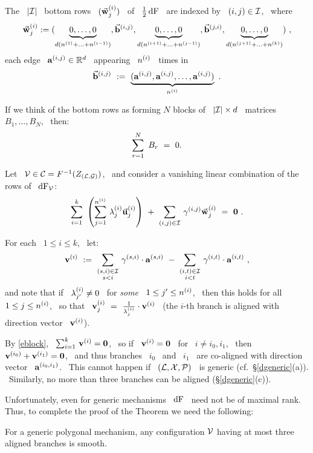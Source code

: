 The \ $|\mathcal{I}|$ \ bottom rows \ $(\vec{\mathbf w}\sp{({i})}\sb{j})$ \ of \ $\frac{1}{2}\operatorname{dF}$ \
are indexed by \ $(i,j)\in\mathcal{I}$, \ where \
$$
\vec{\mathbf w}\sp{({i})}\sb{j}:=
(\underbrace{0,\dotsc,0}_{d(n\sp{({1})}+\dotsc+n\sp{({i-1})})},
\vec{\mathbf{b}}\sp{({i},{j})},\underbrace{0,\dotsc,0}_{d(n\sp{({i+1})}+\dotsc+n\sp{({j-1})})},
\vec{\mathbf{b}}\sp{({j},{i})},\underbrace{0,\dotsc,0}_{d(n\sp{({j+1})}+\dotsc+n\sp{({k})})})~,
$$
%
each edge \ $\mathbf{a}\sp{({i,j})}\in{\mathbb R}^{d}$ \ appearing \ $n\sp{({i})}$ \ times in
$$
\vec{\mathbf{b}}\sp{({i},{j})}~:=~\underbrace{(\mathbf{a}\sp{({i,j})},\mathbf{a}\sp{({i,j})},\dotsc,\mathbf{a}\sp{({i,j})})}_{n\sp{({i})}}~.
$$

If we think of the bottom rows as forming $N$
blocks of \ $|\mathcal{I}|\times d$ \ matrices \ $B_{1},\dotsc, B_{N}$, \
then:
%
\begin{equation}\label{eblock}
\sum_{r=1}^{N}\ B_{r} ~=~ 0\vsm.
\end{equation}

Let \ $\mathcal{V}\in\mathcal{C}=F^{-1}(Z_{(\mathcal{L},\mathcal{G})})$, \ and consider a vanishing
linear combination of the rows of \ $\operatorname{dF}_{\mathcal{V}}$:
$$
\sum_{i=1}^{k}~\left(\sum_{j=1}^{n\sp{({i})}}\,\lambda\sp{({i})}_{j}\vec{\mathbf u}\sp{({i})}\sb{j}\right)~+~
\sum_{(i,j)\in\mathcal{I}}\,\gamma\sp{({i,j})}\vec{\mathbf w}\sp{({i})}\sb{j}~=~\mathbf{0}~.
$$

For each \ $1\leq i\leq k$, \ let:
$$
\mathbf{v}\sp{({i})}~:=~\sum_{\substack{(s,i)\in\mathcal{I}\\ s<i}}\,\gamma\sp{({s,i})}\cdot\mathbf{a}\sp{({s,i})}
~-~\sum_{\substack{(i,t)\in\mathcal{I}\\ i<t}}\,\gamma\sp{({i,t})}\cdot\mathbf{a}\sp{({i,t})}~,
$$
%
and note that if \ $\lambda\sp{({i})}_{j'}\neq 0$ \ for \emph{some} \
$1\leq j'\leq n\sp{({i})}$, \ then this holds for all \ $1\leq j\leq n\sp{({i})}$, \
so that \ $\mathbf{v}\sp{({i})}_{j}~=~\frac{1}{\lambda\sp{({i})}_{j}}\cdot\mathbf{v}\sp{({i})}$ \
(the $i$-th branch is aligned with direction vector \ $\mathbf{v}\sp{({i})}$).

By \eqref{eblock}, \ $\sum_{i=1}^{k}\,\mathbf{v}\sp{({i})}=\mathbf{0}$, \ so if \
$\mathbf{v}\sp{({i})}=\mathbf{0}$ \ for \ $i\neq i_{0},i_{1}$, \ then \
$\mathbf{v}\sp{({i_{0}})}+\mathbf{v}\sp{({i_{1}})}=\mathbf{0}$, \ and thus branches \ $i_{0}$ \ and \
$i_{1}$ \ are co-aligned with direction vector \ $\mathbf{a}\sp{({i_{0},i_{1}})}$. \
This cannot happen if \ $(\mathcal{L},\mathcal{X},\mathcal{P})$ \ is generic
(cf.\ \S \ref{dgeneric}(a)). \ Similarly, no more than three
branches can be aligned (\S \ref{dgeneric}(c)).

Unfortunately, even for generic mechanisms \ $\operatorname{dF}$ \ need not be of maximal
rank. Thus, to complete the proof of the Theorem we need the
following:
%

\begin{prop}\label{pzero}
%
For a generic polygonal mechanism, any configuration $\mathcal{V}$ having
at most three aligned branches is smooth.
%
\end{prop}

